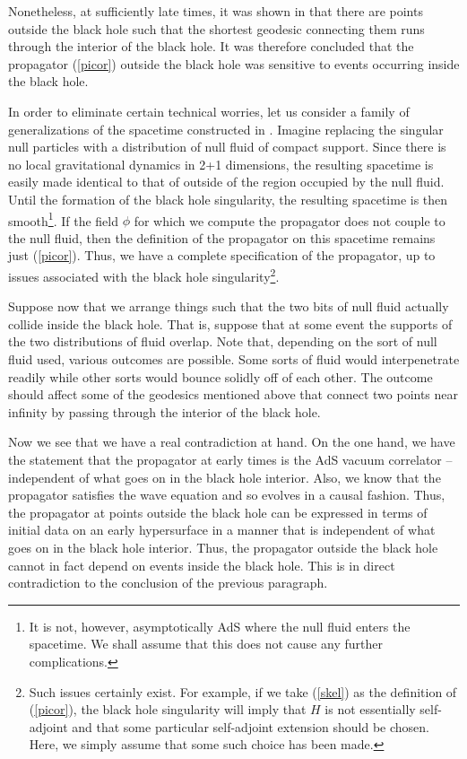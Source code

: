 \documentclass[a4paper,12pt]{article}
\begin{document}
Nonetheless, at sufficiently late times, it was shown in
\cite{holopart} that there are points outside the black hole such that
the shortest geodesic connecting them runs through the interior of the
black hole.  It was therefore concluded that the propagator
(\ref{picor}) outside the black hole was sensitive to events occurring
inside the black hole.

In order to eliminate certain technical worries, let us consider a
family of generalizations of the spacetime constructed in
\cite{holopart}.  Imagine replacing the singular null particles with a
distribution of null fluid of compact support.  Since there is no
local gravitational dynamics in 2+1 dimensions, the resulting
spacetime is easily made identical to that of \cite{holopart} outside
of the region occupied by the null fluid.  Until the formation of the
black hole singularity, the resulting spacetime is then
smooth\footnote{It is not, however, asymptotically AdS where the null
  fluid enters the spacetime.  We shall assume that this does not
  cause any further complications.}.  If the field $\phi$ for which we
compute the propagator does not couple to the null fluid, then the
definition of the propagator on this spacetime remains just
(\ref{picor}).  Thus, we have a complete specification of the
propagator, up to issues associated with the black hole
singularity\footnote{Such issues certainly exist.  For example, if we
  take (\ref{skel}) as the definition of (\ref{picor}), the black hole
  singularity will imply that $H$ is not essentially self-adjoint and
  that some particular self-adjoint extension should be chosen.  Here,
  we simply assume that some such choice has been made.}.

Suppose now that we arrange things such that the two bits of null
fluid actually collide inside the black hole.  That is, suppose that
at some event the supports of the two distributions of fluid overlap.
Note that, depending on the sort of null fluid used, various outcomes
are possible.  Some sorts of fluid would interpenetrate readily while
other sorts would bounce solidly off of each other.  The outcome
should affect some of the geodesics mentioned above that connect two
points near infinity by passing through the interior of the black
hole.

Now we see that we have a real contradiction at hand.  On the one
hand, we have the statement that the propagator at early times is the
AdS vacuum correlator -- independent of what goes on in the black hole
interior.  Also, we know that the propagator satisfies the wave
equation and so evolves in a causal fashion.  Thus, the propagator at
points outside the black hole can be expressed in terms of initial
data on an early hypersurface in a manner that is independent of what
goes on in the black hole interior.  Thus, the propagator outside the
black hole cannot in fact depend on events inside the black hole.
This is in direct contradiction to the conclusion of the previous
paragraph. 
\end{document}
